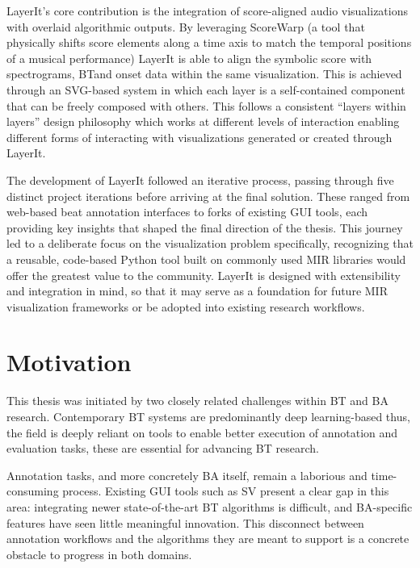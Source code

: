 LayerIt's core contribution is the integration of score-aligned audio visualizations with overlaid algorithmic outputs. By leveraging ScoreWarp (a tool that physically shifts score elements along a time axis to match the temporal positions of a musical performance) LayerIt is able to align the symbolic score with spectrograms, \ac{BT}and onset data within the same visualization. This is achieved through an \ac{SVG}-based system in which each layer is a self-contained component that can be freely composed with others. This follows a consistent ``layers within layers'' design philosophy which works at different levels of interaction enabling different forms of interacting with visualizations generated or created through LayerIt.

The development of LayerIt followed an iterative process, passing through five distinct project iterations before arriving at the final solution. These ranged from web-based beat annotation interfaces to forks of existing \ac{GUI} tools, each providing key insights that shaped the final direction of the thesis. This journey led to a deliberate focus on the visualization problem specifically, recognizing that a reusable, code-based Python tool built on commonly used \ac{MIR} libraries would offer the greatest value to the community. LayerIt is designed with extensibility and integration in mind, so that it may serve as a foundation for future \ac{MIR} visualization frameworks or be adopted into existing research workflows.

\section{Motivation} \label{sec:goals} This thesis was initiated by two closely related challenges within \ac{BT} and \ac{BA} research. Contemporary \ac{BT} systems are predominantly deep learning-based thus, the field is deeply reliant on tools to enable better execution of annotation and evaluation tasks, these are essential for advancing \ac{BT} research. 

Annotation tasks, and more concretely \ac{BA} itself, remain a laborious and time-consuming process. Existing \ac{GUI} tools such as \ac{SV} present a clear gap in this area: integrating newer state-of-the-art \ac{BT} algorithms is difficult, and \ac{BA}-specific features have seen little meaningful innovation. This disconnect between annotation workflows and the algorithms they are meant to support is a concrete obstacle to progress in both domains.

